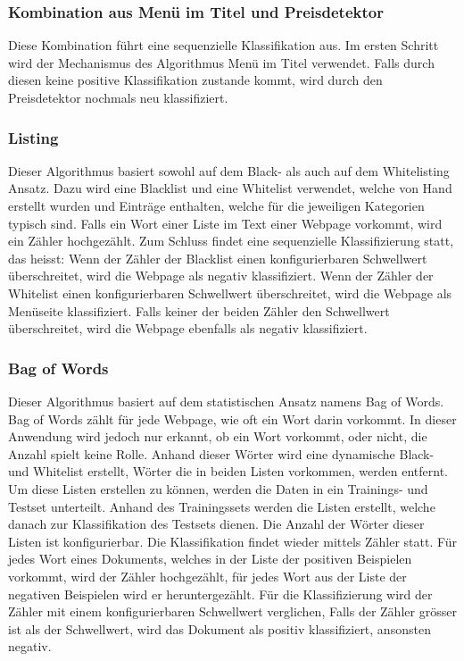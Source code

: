 \subsubsection{Kombination aus Menü im Titel und Preisdetektor}
Diese Kombination führt eine sequenzielle Klassifikation aus.
Im ersten Schritt wird der Mechanismus des Algorithmus \glqq Menü im Titel \grqq verwendet.
Falls durch diesen keine positive Klassifikation zustande kommt, wird durch den Preisdetektor nochmals neu klassifiziert.
\subsubsection{Listing}
Dieser Algorithmus basiert sowohl auf dem Black- als auch auf dem Whitelisting Ansatz.
Dazu wird eine Blacklist und eine Whitelist verwendet, welche von Hand erstellt wurden und Einträge enthalten, welche für die jeweiligen Kategorien typisch sind.
Falls ein Wort einer Liste im Text einer Webpage vorkommt, wird ein Zähler hochgezählt.
Zum Schluss findet eine sequenzielle Klassifizierung statt, das heisst: 
Wenn der Zähler der Blacklist einen konfigurierbaren Schwellwert überschreitet, wird die Webpage als negativ klassifiziert. 
Wenn der Zähler der Whitelist einen konfigurierbaren Schwellwert überschreitet, wird die Webpage als Menüseite klassifiziert.
Falls keiner der beiden Zähler den Schwellwert überschreitet, wird die Webpage ebenfalls als negativ klassifiziert. 
\subsubsection{Bag of Words}
Dieser Algorithmus basiert auf dem statistischen Ansatz namens \glqq Bag of Words\grqq.
Bag of Words zählt für jede Webpage, wie oft ein Wort darin vorkommt.
In dieser Anwendung wird jedoch nur erkannt, ob ein Wort vorkommt, oder nicht, die Anzahl spielt keine Rolle.
Anhand dieser Wörter wird eine dynamische Black- und Whitelist erstellt, Wörter die in beiden Listen vorkommen, werden entfernt.
Um diese Listen erstellen zu können, werden die Daten in ein Trainings- und Testset unterteilt.
Anhand des Trainingssets werden die Listen erstellt, welche danach zur Klassifikation des Testsets dienen.
Die Anzahl der Wörter dieser Listen ist konfigurierbar.
Die Klassifikation findet wieder mittels Zähler statt.
Für jedes Wort eines Dokuments, welches in der Liste der positiven Beispielen vorkommt, wird der Zähler hochgezählt, für jedes Wort aus der Liste der negativen Beispielen wird er heruntergezählt.
Für die Klassifizierung wird der Zähler mit einem konfigurierbaren Schwellwert verglichen, Falls der Zähler grösser ist als der Schwellwert, wird das Dokument als positiv klassifiziert, ansonsten negativ.
